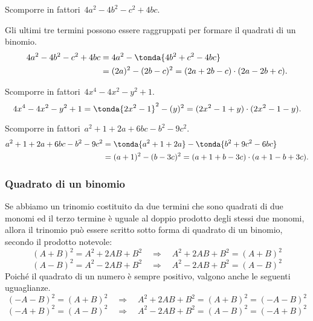  \begin{esempio}
Scomporre in fattori~\(4a^{2}-4b^{2}-c^{2}+4bc\).

Gli ultimi tre termini possono essere raggruppati per formare il quadrati di 
un binomio.
 \begin{equation*}
   \begin{split}
     4a^{2}-4b^{2}-c^{2}+4bc &=4a^{2}-\tonda{4b^{2}+c^{2}-4bc} \\
                 &= (2a)^{2}-(2b-c)^{2}=(2a+2b-c)\cdot (2a-2b+c).
   \end{split}
  \end{equation*}
 \end{esempio}

 \begin{esempio}
Scomporre in fattori~\(4x^4-4x^2-y^{2}+1\).
\[4x^4-4x^2-y^{2}+1=\tonda{2x^2-1}^{2}-(y)^{2}=(2x^2-1+y)\cdot 
(2x^2-1-y).\]
 \end{esempio}

 \begin{esempio}
Scomporre in fattori~\(a^{2}+1+2a+6bc-b^{2}-9c^{2}\).
 \begin{equation*}
   \begin{split}
     a^{2}+1+2a+6bc-b^{2}-9c^{2} 
&=\tonda{a^{2}+1+2a}-\tonda{b^{2}+9c^{2}-6{bc}} \\
                 &= (a+1)^{2}-(b-3c)^{2}=(a+1+b-3c)\cdot (a+1-b+3c).
   \end{split}
  \end{equation*}
 \end{esempio}
% 
\subsubsection{Quadrato di un binomio}
\label{subsubsec:divpol_quadbin}

Se abbiamo un trinomio costituito da due termini che sono quadrati di due 
monomi ed il terzo termine è uguale al doppio prodotto
degli stessi due monomi, allora il trinomio può essere scritto sotto forma di 
quadrato di un binomio, secondo il prodotto notevole:
\[(A+B)^{2}=A^{2}+2AB+B^{2}\quad \Rightarrow \quad 
  A^{2}+2AB+B^{2}=(A+B)^{2}\]
\[(A-B)^{2}=A^{2}-2AB+B^{2}\quad \Rightarrow \quad 
  A^{2}-2AB+B^{2}=(A-B)^{2}\]
Poiché il quadrato di un numero è sempre positivo, valgono anche le seguenti 
uguaglianze.
\[(-A-B)^{2}=(A+B)^{2}\quad\Rightarrow\quad 
  A^{2}+2AB+B^{2}=(A+B)^{2}=(-A-B)^{2}\]
\[(-A+B)^{2}=(A-B)^{2}\quad \Rightarrow \quad 
A^{2}-2AB+B^{2}=(A-B)^{2}=(-A+B)^{2}\]

